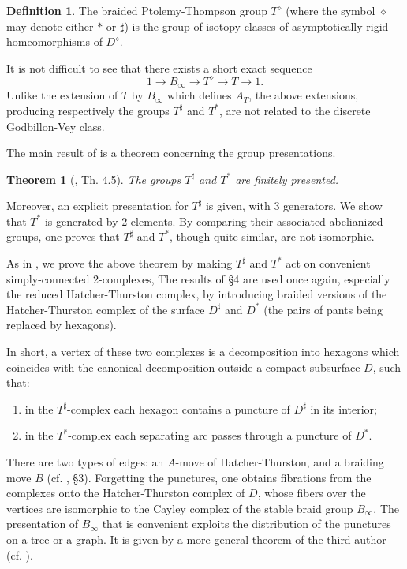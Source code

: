 \documentclass[twoside]{irmaems}
\theoremstyle{plain}
\newtheorem{theorem}{Theorem}[section]
\theoremstyle{definition}
\newtheorem{definition}{Definition}[section]
\theoremstyle{remark}
\begin{document}
\begin{definition}
The braided Ptolemy-Thompson group $T^{\diamond}$ 
(where the symbol $\diamond$ may denote either $*$ or $\sharp$) is the 
group of isotopy classes of asymptotically rigid 
homeomorphisms of $D^{\diamond}$.
\end{definition}

\vspace{0.1cm}\noindent 
It is not difficult to see that there exists a short exact sequence 
$$1\rightarrow B_{\infty}\longrightarrow T^{\diamond}\longrightarrow T\rightarrow 1.$$ 
Unlike the extension of $T$ by $B_{\infty}$ which defines $A_{T}$, the above extensions, producing 
respectively the groups $T^{\sharp}$ and $T^*$, are not related to the discrete Godbillon-Vey class. 


\vspace{0.1cm}\noindent 
The main result of \cite{fu-ka2} is a theorem concerning 
the group presentations.

 \begin{theorem}[\cite{fu-ka2}, Th. 4.5]
 The groups $T^{\sharp}$ and $T^*$ are finitely presented.
 \end{theorem}


\vspace{0.1cm}\noindent 
Moreover, an explicit presentation for $T^{\sharp}$ is given, with 3 generators. We show that $T^*$ is generated 
by  2 elements. By comparing their associated abelianized groups, one proves that 
$T^{\sharp}$ and $T^*$, though quite similar, are not isomorphic.

\vspace{0.1cm}\noindent 
As in \cite{fu-ka1}, we prove the above theorem by making  $T^{\sharp}$ and $T^*$ act on convenient simply-connected 2-complexes, 
The results of \S 4 are used once again, especially 
the reduced Hatcher-Thurston complex, by introducing braided 
versions of the Hatcher-Thurston complex of the surface $D^{\sharp}$ and $D^*$ (the pairs of pants being replaced 
by hexagons).

\vspace{0.1cm}\noindent 
In short, a vertex of these two complexes is a decomposition into hexagons which coincides with the canonical decomposition 
outside a compact subsurface $D$, such that:
\begin{enumerate} 
\item  in the $T^{\sharp}$-complex 
 each hexagon contains a puncture of $D^{\sharp}$ in its interior; 
\item in the $T^*$-complex  each separating arc 
passes through a puncture of $D^*$.
\end{enumerate}
 There are two types of edges: an $A$-move of Hatcher-Thurston, and a braiding move $B$ (cf. \cite{fu-ka2}, \S3). 
 Forgetting the punctures, one obtains fibrations from the complexes onto the Hatcher-Thurston complex of $D$, whose fibers 
 over the vertices are isomorphic to the Cayley complex of the stable braid group $B_{\infty}$. 
The presentation of $B_{\infty}$ that is convenient exploits the distribution of the punctures on a tree or a graph. It is given 
by a more general theorem of the third author (cf. \cite{se}). 
\end{document}
